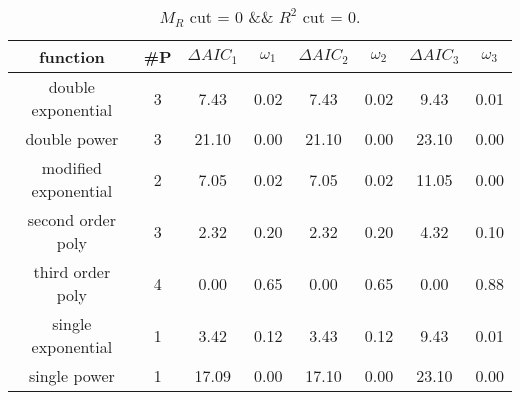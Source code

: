 \begin{table}[H] 
\begin{center} 
\begin{tabular}{|c|c|cc|cc|cc|} 
\hline function & \#P & $\Delta AIC_1$ & $\omega_1$ & $\Delta AIC_2$ & $\omega_2$ & $\Delta AIC_3$ & $\omega_3$ \\ \hline 
double exponential &  3 &   7.43 &   0.02 &   7.43 &   0.02 &   9.43 &   0.01 \\ 
double power &  3 &  21.10 &   0.00 &  21.10 &   0.00 &  23.10 &   0.00 \\ 
modified exponential &  2 &   7.05 &   0.02 &   7.05 &   0.02 &  11.05 &   0.00 \\ 
second order poly &  3 &   2.32 &   0.20 &   2.32 &   0.20 &   4.32 &   0.10 \\ 
third order poly &  4 &   0.00 &   0.65 &   0.00 &   0.65 &   0.00 &   0.88 \\ 
single exponential &  1 &   3.42 &   0.12 &   3.43 &   0.12 &   9.43 &   0.01 \\ 
single power &  1 &  17.09 &   0.00 &  17.10 &   0.00 &  23.10 &   0.00 \\ 
\hline 
\end{tabular} 
\caption{$M_R$ cut = 0 \&\& $R^2$ cut = 0.} 
\label{tab:FitChoices_0_0} 
\end{center} 
\end{table} 
 
 
